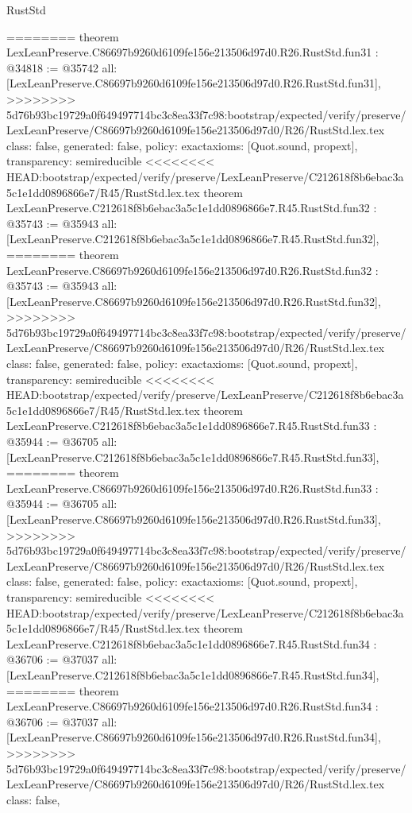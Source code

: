 \begin{lexlean}{RustStd}
\begin{coremodule}
{\begin{coremodule}
{{{{{{{{{{{{{{{{{{{{{{{{{{{{{{{{{{========
theorem LexLeanPreserve.C86697b9260d6109fe156e213506d97d0.R26.RustStd.fun31 : @34818 := @35742 {
  all: [LexLeanPreserve.C86697b9260d6109fe156e213506d97d0.R26.RustStd.fun31],
>>>>>>>> 5d76b93bc19729a0f649497714bc3c8ea33f7c98:bootstrap/expected/verify/preserve/LexLeanPreserve/C86697b9260d6109fe156e213506d97d0/R26/RustStd.lex.tex
  class: false,
  generated: false,
  policy: exact{axioms: [Quot.sound, propext]},
  transparency: semireducible
}
<<<<<<<< HEAD:bootstrap/expected/verify/preserve/LexLeanPreserve/C212618f8b6ebac3a5c1e1dd0896866e7/R45/RustStd.lex.tex
theorem LexLeanPreserve.C212618f8b6ebac3a5c1e1dd0896866e7.R45.RustStd.fun32 : @35743 := @35943 {
  all: [LexLeanPreserve.C212618f8b6ebac3a5c1e1dd0896866e7.R45.RustStd.fun32],
========
theorem LexLeanPreserve.C86697b9260d6109fe156e213506d97d0.R26.RustStd.fun32 : @35743 := @35943 {
  all: [LexLeanPreserve.C86697b9260d6109fe156e213506d97d0.R26.RustStd.fun32],
>>>>>>>> 5d76b93bc19729a0f649497714bc3c8ea33f7c98:bootstrap/expected/verify/preserve/LexLeanPreserve/C86697b9260d6109fe156e213506d97d0/R26/RustStd.lex.tex
  class: false,
  generated: false,
  policy: exact{axioms: [Quot.sound, propext]},
  transparency: semireducible
}
<<<<<<<< HEAD:bootstrap/expected/verify/preserve/LexLeanPreserve/C212618f8b6ebac3a5c1e1dd0896866e7/R45/RustStd.lex.tex
theorem LexLeanPreserve.C212618f8b6ebac3a5c1e1dd0896866e7.R45.RustStd.fun33 : @35944 := @36705 {
  all: [LexLeanPreserve.C212618f8b6ebac3a5c1e1dd0896866e7.R45.RustStd.fun33],
========
theorem LexLeanPreserve.C86697b9260d6109fe156e213506d97d0.R26.RustStd.fun33 : @35944 := @36705 {
  all: [LexLeanPreserve.C86697b9260d6109fe156e213506d97d0.R26.RustStd.fun33],
>>>>>>>> 5d76b93bc19729a0f649497714bc3c8ea33f7c98:bootstrap/expected/verify/preserve/LexLeanPreserve/C86697b9260d6109fe156e213506d97d0/R26/RustStd.lex.tex
  class: false,
  generated: false,
  policy: exact{axioms: [Quot.sound, propext]},
  transparency: semireducible
}
<<<<<<<< HEAD:bootstrap/expected/verify/preserve/LexLeanPreserve/C212618f8b6ebac3a5c1e1dd0896866e7/R45/RustStd.lex.tex
theorem LexLeanPreserve.C212618f8b6ebac3a5c1e1dd0896866e7.R45.RustStd.fun34 : @36706 := @37037 {
  all: [LexLeanPreserve.C212618f8b6ebac3a5c1e1dd0896866e7.R45.RustStd.fun34],
========
theorem LexLeanPreserve.C86697b9260d6109fe156e213506d97d0.R26.RustStd.fun34 : @36706 := @37037 {
  all: [LexLeanPreserve.C86697b9260d6109fe156e213506d97d0.R26.RustStd.fun34],
>>>>>>>> 5d76b93bc19729a0f649497714bc3c8ea33f7c98:bootstrap/expected/verify/preserve/LexLeanPreserve/C86697b9260d6109fe156e213506d97d0/R26/RustStd.lex.tex
  class: false,
}}}}}}}}}}}}}}}}}}}}}}}}}}}}}}}}}}}}}}
\end{coremodule}}
\end{coremodule}
\end{lexlean}

